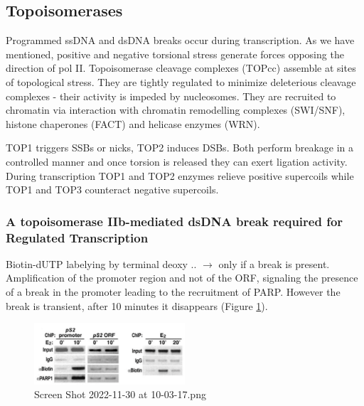 \hypertarget{topoisomerases}{%
\subsection{Topoisomerases}\label{topoisomerases}}

Programmed ssDNA and dsDNA breaks occur during transcription. As we have mentioned, positive and negative torsional stress generate forces opposing the direction of pol II. Topoisomerase cleavage complexes (TOPcc) assemble at sites of topological stress. They are tightly regulated to minimize deleterious cleavage complexes - their activity is impeded by nucleosomes. They are recruited to chromatin via interaction with chromatin remodelling complexes (SWI/SNF), histone chaperones (FACT) and helicase enzymes (WRN).

TOP1 triggers SSBs or nicks, TOP2 induces DSBs. Both perform breakage in a controlled manner and once torsion is released they can exert ligation activity. During transcription TOP1 and TOP2 enzymes relieve positive supercoils while TOP1 and TOP3 counteract negative supercoils.

\hypertarget{a-topoisomerase-iib-mediated-dsdna-break-required-for-regulated-transcription}{%
\subsubsection{A topoisomerase IIb-mediated dsDNA break required for Regulated Transcription}\label{a-topoisomerase-iib-mediated-dsdna-break-required-for-regulated-transcription}}

Biotin-dUTP labelying by terminal deoxy .. $\rightarrow$ only if a break is present. Amplification of the promoter region and not of the ORF, signaling the presence of a break in the promoter leading to the recruitment of PARP. However the break is transient, after 10 minutes it disappears (Figure \ref{fig:biot}).

\begin{figure}
\centering
\includegraphics[width=0.5\textwidth]{../_resources/Screen_Shot_2022-11-30_at_10-03-17.png}
\caption{Screen Shot 2022-11-30 at 10-03-17.png}
\label{fig:biot}
\end{figure}

